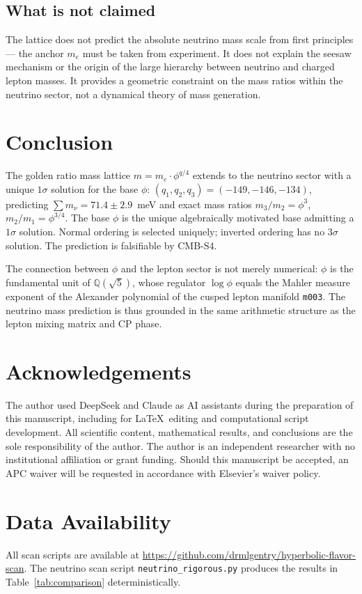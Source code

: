 \documentclass[12pt]{article}
\theoremstyle{definition}
\begin{document}
\subsection{What is not claimed}

The lattice does not predict the absolute neutrino mass scale
from first principles — the anchor $m_e$ must be taken from
experiment. It does not explain the seesaw mechanism or the origin
of the large hierarchy between neutrino and charged lepton masses.
It provides a geometric constraint on the mass ratios within the
neutrino sector, not a dynamical theory of mass generation.

\section{Conclusion}
\label{sec:conclusion}

The golden ratio mass lattice $m = m_e \cdot \phi^{q/4}$ extends
to the neutrino sector with a unique $1\sigma$ solution for the base
$\phi$: $(q_1, q_2, q_3) = (-149, -146, -134)$, predicting
$\sum m_\nu = 71.4 \pm 2.9$~meV and exact mass ratios
$m_3/m_2 = \phi^3$, $m_2/m_1 = \phi^{3/4}$. The base $\phi$ is the
unique algebraically motivated base admitting a $1\sigma$ solution.
Normal ordering is selected uniquely; inverted ordering has no
$3\sigma$ solution. The prediction is falsifiable by CMB-S4.

The connection between $\phi$ and the lepton sector is not merely
numerical: $\phi$ is the fundamental unit of $\mathbb{Q}(\sqrt{5})$,
whose regulator $\log\phi$ equals the Mahler measure exponent of
the Alexander polynomial of the cusped lepton manifold \texttt{m003}.
The neutrino mass prediction is thus grounded in the same arithmetic
structure as the lepton mixing matrix and CP phase.


\section*{Acknowledgements}
The author used DeepSeek and Claude as AI assistants during the
preparation of this manuscript, including for \LaTeX\ editing and
computational script development. All scientific content,
mathematical results, and conclusions are the sole responsibility
of the author.
The author is an independent researcher with no institutional
affiliation or grant funding. Should this manuscript be accepted,
an APC waiver will be requested in accordance with Elsevier's
waiver policy.

\section*{Data Availability}
All scan scripts are available at
\url{https://github.com/drmlgentry/hyperbolic-flavor-scan}.
The neutrino scan script \texttt{neutrino\_rigorous.py} produces
the results in Table~\ref{tab:comparison} deterministically.
\end{document}
